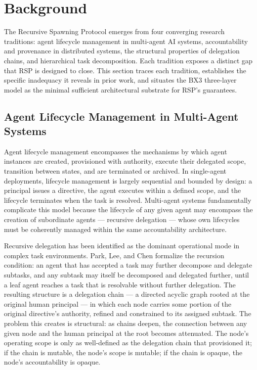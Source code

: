 \section{Background}
\label{sec:rs-background}

The Recursive Spawning Protocol emerges from four converging research traditions: agent lifecycle management in multi-agent AI systems, accountability and provenance in distributed systems, the structural properties of delegation chains, and hierarchical task decomposition. Each tradition exposes a distinct gap that RSP is designed to close. This section traces each tradition, establishes the specific inadequacy it reveals in prior work, and situates the BX3 three-layer model as the minimal sufficient architectural substrate for RSP's guarantees.

\subsection{Agent Lifecycle Management in Multi-Agent Systems}
\label{sec:rs-agent-lifecycle}

Agent lifecycle management encompasses the mechanisms by which agent instances are created, provisioned with authority, execute their delegated scope, transition between states, and are terminated or archived. In single-agent deployments, lifecycle management is largely sequential and bounded by design: a principal issues a directive, the agent executes within a defined scope, and the lifecycle terminates when the task is resolved. Multi-agent systems fundamentally complicate this model because the lifecycle of any given agent may encompass the creation of subordinate agents — recursive delegation — whose own lifecycles must be coherently managed within the same accountability architecture.\cite{intelligent_ai_delegation}

Recursive delegation has been identified as the dominant operational mode in complex task environments. Park, Lee, and Chen formalize the recursion condition: an agent that has accepted a task may further decompose and delegate subtasks, and any subtask may itself be decomposed and delegated further, until a leaf agent reaches a task that is resolvable without further delegation.\cite{arxiv2602.11865} The resulting structure is a delegation chain — a directed acyclic graph rooted at the original human principal — in which each node carries some portion of the original directive's authority, refined and constrained to its assigned subtask. The problem this creates is structural: as chains deepen, the connection between any given node and the human principal at the root becomes attenuated. The node's operating scope is only as well-defined as the delegation chain that provisioned it; if the chain is mutable, the node's scope is mutable; if the chain is opaque, the node's accountability is opaque.\cite{zylos_hierarchical_coordination}

